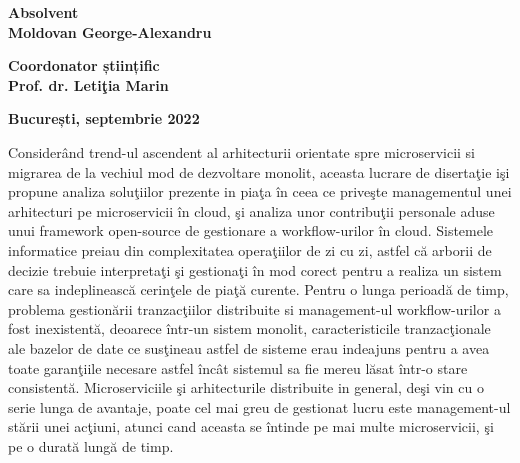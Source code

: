 \documentclass[a4paper,12pt]{report}
\renewenvironment{abstract}[1]
  {\bigskip\selectlanguage{#1}%
   \begin{center}\bfseries\abstractname\end{center}}
  {\par\bigskip}
\begin{document}
\begin{titlepage}
\begin{center}
        \vspace{2.5cm}
        \begin{large}
            \textbf{Absolvent}\\
            \vspace*{0.25cm}
            \textbf{Moldovan George-Alexandru}
        \end{large}
        
        \vspace{2cm}
        \begin{large}
            \textbf{Coordonator științific}\\
            \vspace*{0.25cm}
            \textbf{Prof. dr. Letiţia Marin}
        \end{large}
        
        \vspace{2.5cm}
        \begin{large}
            \textbf{București, septembrie 2022}
        \end{large}
    \end{center}
\end{titlepage}
\begin{abstract}{romanian}
\par Considerând trend-ul ascendent al arhitecturii orientate spre microservicii si migrarea de la vechiul mod de dezvoltare monolit, aceasta lucrare de disertaţie işi propune analiza soluţiilor prezente in piaţa în ceea ce priveşte managementul unei arhitecturi pe microservicii în cloud, şi analiza unor contribuţii personale aduse unui framework open-source de gestionare a workflow-urilor în cloud. Sistemele informatice preiau din complexitatea operaţiilor de zi cu zi, astfel că arborii de decizie trebuie interpretaţi şi gestionaţi în mod corect pentru a realiza un sistem care sa indeplinească cerinţele de piaţă curente. Pentru o lunga perioadă de timp, problema gestionării tranzacţiilor distribuite si management-ul workflow-urilor a fost inexistentă, deoarece într-un sistem monolit, caracteristicile tranzacţionale ale bazelor de date ce susţineau astfel de sisteme erau indeajuns pentru a avea toate garanţiile necesare astfel încât sistemul sa fie mereu lăsat într-o stare consistentă. Microserviciile şi arhitecturile distribuite in general, deşi vin cu o serie lunga de avantaje, poate cel mai greu de gestionat lucru este management-ul stării unei acţiuni, atunci cand aceasta se întinde pe mai multe microservicii, şi pe o durată lungă de timp. 
\end{abstract}
\end{document}
